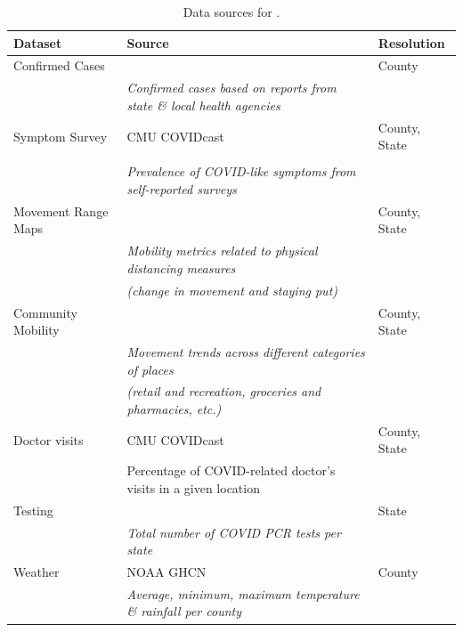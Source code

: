 \begin{table}[t]
\small
\caption{Data sources for \bAR.\label{tab:data-sources}}
\centering
\begin{tabular}{lll}
\toprule
\bf Dataset & \bf Source & \bf Resolution \\
\midrule
Confirmed Cases &  \citet{data/nytimes_cases} &  County \\
& \multicolumn{1}{l}{\it Confirmed cases based on reports from state \& local health agencies} \\
\midrule
Symptom Survey & CMU COVIDcast \citep{data/covidcast} & County, State \\
& \citet{data/fb_symptom_survey} \\
& \multicolumn{1}{l}{\it Prevalence of COVID-like symptoms from self-reported surveys} \\
\midrule
Movement Range Maps &  \citet{data/fb_movement_range} &  County, State \\
& \multicolumn{1}{l}{\it Mobility metrics related to physical distancing measures} \\
& \multicolumn{1}{l}{\it (change in movement and staying put)} \\
\midrule
Community Mobility & \citet{data/google_mobility} &  County, State \\
& \multicolumn{1}{l}{\it Movement trends across different categories of places} \\
& \multicolumn{1}{l}{\it (retail and recreation, groceries and pharmacies, etc.)} \\
\midrule
Doctor visits & CMU COVIDcast \citep{data/covidcast} & County, State \\
& \multicolumn{1}{l}{Percentage of COVID-related doctor’s visits in a given location} \\
\midrule
Testing &  \citet{data/covidtracking} & State \\
& \multicolumn{1}{l}{\it Total number of COVID PCR tests per state} \\
\midrule
Weather & NOAA GHCN \citep{data/menne2012overview} &  County \\
& \multicolumn{1}{l}{\it Average, minimum, maximum temperature \& rainfall per county} \\
\bottomrule
\end{tabular}
\end{table}

